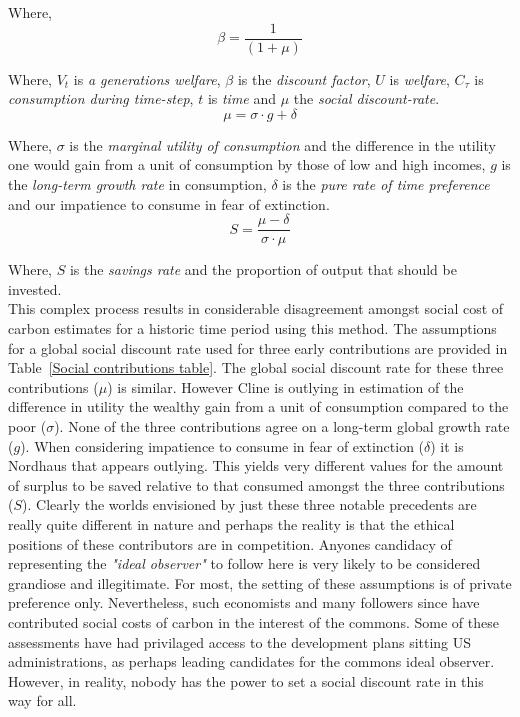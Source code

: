 \documentclass[11pt, oneside]{article}   	%
\begin{document}
Where,
\begin{equation}
\beta = \frac{1}{(1+\mu)}
\end{equation}

Where, $V_t$ is \emph{a generations welfare}, $\beta$ is the \emph{discount factor}, $U$ is \emph{welfare}, $C_\tau$ is \emph{consumption during time-step}, $t$ is \emph{time} and $\mu$ the \emph{social discount-rate}.\\

\begin{equation}
\mu = \sigma \cdot g + \delta
\end{equation}

Where, $\sigma$ is the \emph{marginal utility of consumption} and the difference in the utility one would gain from a unit of consumption by those of low and high incomes, $g$ is the \emph{long-term growth rate} in consumption, $\delta$ is the \emph{pure rate of time preference} and our impatience to consume in fear of extinction.\\

\begin{equation}
S = \frac{\mu-\delta}{\sigma \cdot \mu}
\end{equation}

Where, $S$ is the \emph{savings rate} and the proportion of output that should be invested.\\

This complex process results in considerable disagreement amongst social cost of carbon estimates for a historic time period using this method.
The assumptions for a global social discount rate used for three early contributions are provided in Table~\ref{Social contributions table}.
The global social discount rate for these three contributions ($\mu$) is similar.
However Cline is outlying in estimation of the difference in utility the wealthy gain from a unit of consumption compared to the poor ($\sigma$).
None of the three contributions agree on a long-term global growth rate ($g$).
When considering impatience to consume in fear of extinction ($\delta$) it is Nordhaus that appears outlying.
This yields very different values for the amount of surplus to be saved relative to that consumed amongst the three contributions ($S$).
Clearly the worlds envisioned by just these three notable precedents are really quite different in nature and perhaps the reality is that the ethical positions of these contributors are in competition.
Anyones candidacy of representing the \emph{"ideal observer"} to follow here is very likely to be considered grandiose and illegitimate.
For most, the setting of these assumptions is of private preference only.
Nevertheless, such economists and many followers since have contributed social costs of carbon in the interest of the commons.
Some of these assessments have had privilaged access to the development plans sitting US administrations, as perhaps leading candidates for the commons ideal observer.
However, in reality, nobody has the power to set a social discount rate in this way for all.\\
\end{document}
